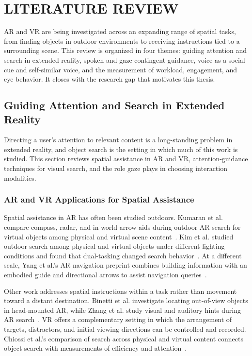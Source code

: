 \chapter{LITERATURE REVIEW}
\label{ch:literature}
AR and VR are being investigated across an expanding range of spatial tasks, from finding objects in outdoor environments to receiving instructions tied to a surrounding scene. This review is organized in four themes: guiding attention and search in extended reality, spoken and gaze-contingent guidance, voice as a social cue and self-similar voice, and the measurement of workload, engagement, and eye behavior. It closes with the research gap that motivates this thesis.

\section{Guiding Attention and Search in Extended Reality}
Directing a user's attention to relevant content is a long-standing problem in extended reality, and object search is the setting in which much of this work is studied. This section reviews spatial assistance in AR and VR, attention-guidance techniques for visual search, and the role gaze plays in choosing interaction modalities.

\subsection{AR and VR Applications for Spatial Assistance}
Spatial assistance in AR has often been studied outdoors. Kumaran et al. compare compass, radar, and in-world arrow aids during outdoor AR search for virtual objects among physical and virtual scene content~\cite{kumaran2023navigation}. Kim et al. studied outdoor search among physical and virtual objects under different lighting conditions and found that dual-tasking changed search behavior~\cite{kim2022physicalvirtual}. At a different scale, Yang et al.'s AR navigation preprint combines building information with an embodied guide and directional arrows to assist navigation queries~\cite{yang2025embodiednavigation}.

Other work addresses spatial instructions within a task rather than movement toward a distant destination. Binetti et al. investigate locating out-of-view objects in head-mounted AR, while Zhang et al. study visual and auditory hints during AR search~\cite{binetti2021outofview,zhang2023seehear}. VR offers a complementary setting in which the arrangement of targets, distractors, and initial viewing directions can be controlled and recorded. Chiossi et al.'s comparison of search across physical and virtual content connects object search with measurements of efficiency and attention~\cite{chiossi2024searching}.

